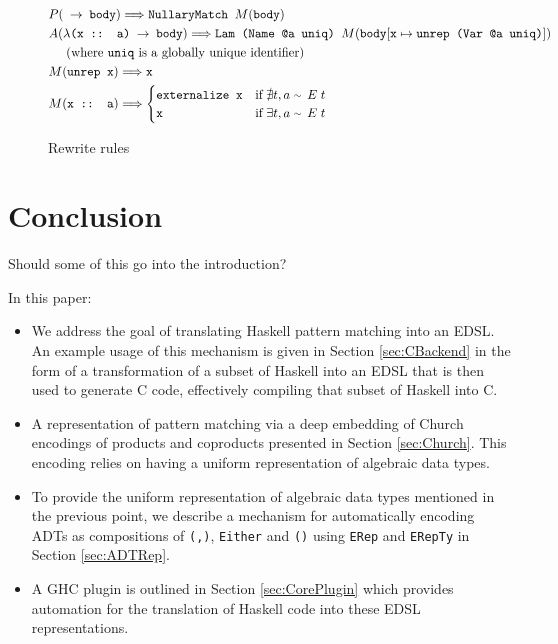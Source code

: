 \documentclass[runningheads, a4paper]{llncs}
\newcommand{\expr}[1]{(#1)} %
\newcommand{\rarr}{\rightarrow}
\newcommand{\rewrites}{\Longrightarrow}
\newcommand{\typeeq}{\raise.17ex\hbox{$\scriptstyle\mathtt{\sim}$}\,\;}
\newcommand{\ttt}{\texttt}
\newcommand{\showtodos}{}  %
\newenvironment{todo}
  {\ifthenelse{\isundefined{\showtodos}}{\comment}{\begin{tcolorbox}
    \textbf{TODO}:}}
  {\ifthenelse{\isundefined{\showtodos}}{\endcomment}{\end{tcolorbox}}
  }
\begin{document}
\begin{figure}[hp]
\begin{align*}
  &P\expr{\ttt{ $\rarr$ body}} \rewrites \ttt{NullaryMatch $M\expr{\ttt{body}}$}\\
  &A\expr{\ttt{$\lambda$(x :: a) $\rarr$ body}} \rewrites \ttt{Lam (Name @a uniq) $M\expr{\ttt{body$[\ttt{x} \mapsto \ttt{unrep (Var @a uniq)}]$}}$}\\
  &\text{\;\;\;\;\;(where \ttt{uniq} is a globally unique identifier)}\\
  &M\expr{\ttt{unrep x}} \rewrites \ttt{x}\\
  &M\expr{\ttt{x :: a}} \rewrites
    \begin{cases}
      \ttt{externalize x} & \text{if}\; \nexists t, a\; \typeeq E\; t\\
      \ttt{x} & \text{if}\; \exists t, a\; \typeeq E\; t
    \end{cases}
\end{align*}

\caption{Rewrite rules}
\label{fig:Rewrites}
\end{figure}



\section{Conclusion}

\begin{todo}
Should some of this go into the introduction?
\end{todo}


In this paper:
\begin{itemize}
  \item We address the goal of translating Haskell pattern matching into an
    EDSL. An example usage of this mechanism is given in Section
    \ref{sec:CBackend} in the form of a transformation of a subset of Haskell
    into an EDSL that is then used to generate C code, effectively compiling
    that subset of Haskell into C.

  \item A representation of pattern matching via a deep embedding of Church
    encodings of products and coproducts presented in Section \ref{sec:Church}.
    This encoding relies on having a uniform representation of algebraic data
    types.

  \item To provide the uniform representation of algebraic data types mentioned
    in the previous point, we describe a mechanism for automatically encoding
    ADTs as compositions of \verb|(,)|, \verb|Either| and \verb|()| using
    \verb|ERep| and \verb|ERepTy| in Section \ref{sec:ADTRep}.

  \item A GHC plugin is outlined in Section \ref{sec:CorePlugin} which provides automation for the translation of
    Haskell code into these EDSL representations.

\end{itemize}
\end{document}
